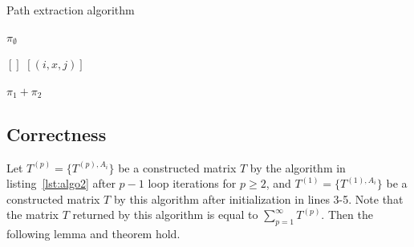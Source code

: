 {\small
	\begin{algorithm}
		\begin{algorithmic}[1]
			\caption{Path extraction algorithm}
			\label{lst:algo3}
			
			\State \Return $\pi_{\emptyset}$
			\EndIf
			
			\State \Return $[]$
			\EndIf
			\State \Return $[(i,x,j)]$
			\EndIf
			\EndFor
			\EndIf
			
			
						
			\State \Return $\pi_1 + \pi_2$
			\EndIf
			\EndIf
			\EndFor
			\EndFunction
		\end{algorithmic}
	\end{algorithm}
}

\subsection{Correctness}

Let $T^{(p)} = \{T^{(p), A_i}\}$ be a constructed matrix $T$ by the algorithm in listing~\ref{lst:algo2} after $p-1$ loop iterations for $p \geq 2$, and $T^{(1)} = \{T^{(1), A_i}\}$ be a constructed matrix $T$ by this algorithm after initialization in lines 3-5. Note that the matrix $T$ returned by this algorithm is equal to $\sum_{p = 1}^{\infty} T^{(p)}$. Then the following lemma and theorem hold.

